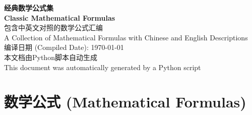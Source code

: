 \documentclass[12pt,a4paper]{article}
\begin{document}
\begin{titlepage}
\centering
\vspace*{2cm}
{\Huge\bfseries 经典数学公式集}\\[0.5cm]
{\Large\bfseries Classic Mathematical Formulas}\\[2cm]
{\large 包含中英文对照的数学公式汇编}\\[0.3cm]
{\large A Collection of Mathematical Formulas with Chinese and English Descriptions}\\[3cm]
{\large 编译日期 (Compiled Date): \today}\\[2cm]
\vfill
{\large 本文档由Python脚本自动生成}\\
{\large This document was automatically generated by a Python script}
\end{titlepage}

\newpage

\section{数学公式 (Mathematical Formulas)}
\end{document}
